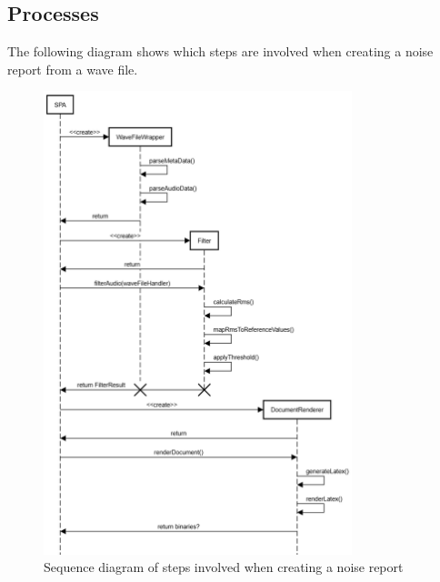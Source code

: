 \subsection{Processes}
The following diagram shows which steps are involved when creating a noise report from a wave file.

\begin{figure}[H]
    \centering
    \includegraphics[width=0.8\textwidth]{../assets/sequence_diagram_from_wave_file_to_pdf.png}
    \caption{Sequence diagram of steps involved when creating a noise report}\label{fig:sequence-diagram-noise-report}
\end{figure}

